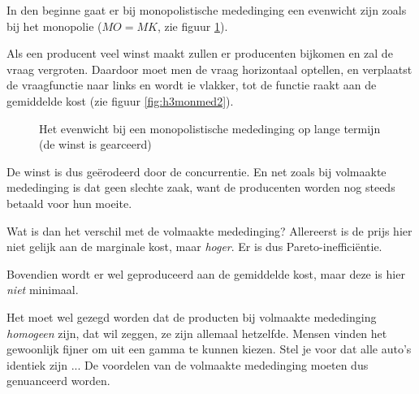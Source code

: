 In den beginne gaat er bij monopolistische mededinging een evenwicht zijn zoals bij het monopolie ($MO=MK$, zie figuur \ref{fig:h3monmed}).\\

\par Als een producent veel winst maakt zullen er producenten bijkomen en zal de vraag vergroten. Daardoor moet men de vraag horizontaal optellen, en verplaatst de vraagfunctie naar links en wordt ie vlakker, tot de functie raakt aan de gemiddelde kost (zie figuur \ref{fig:h3monmed2}).

\begin{figure}[H]
\vspace{0.5cm}
\centering
\captionsetup{justification=centering,margin=2cm}
\caption{Het evenwicht bij een monopolistische mededinging op lange termijn (de winst is gearceerd)}
\label{fig:h3monmed}
\end{figure}

De winst is dus ge\"erodeerd door de concurrentie. En net zoals bij volmaakte mededinging is dat geen slechte zaak, want de producenten worden nog steeds betaald voor hun moeite.\\

\par Wat is dan het verschil met de volmaakte mededinging? Allereerst is de prijs hier niet gelijk aan de marginale kost, maar \textit{hoger}. Er is dus Pareto-ineffici\"entie.
\par Bovendien wordt er wel geproduceerd aan de gemiddelde kost, maar deze is hier \textit{niet} minimaal.
\par Het moet wel gezegd worden dat de producten bij volmaakte mededinging \textit{homogeen} zijn, dat wil zeggen, ze zijn allemaal hetzelfde. Mensen vinden het gewoonlijk fijner om uit een gamma te kunnen kiezen. Stel je voor dat alle auto's identiek zijn ... De voordelen van de volmaakte mededinging moeten dus genuanceerd worden. 

